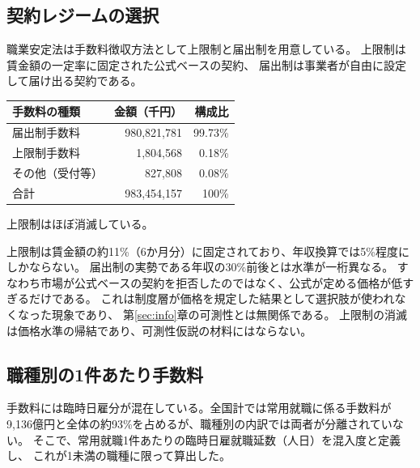 \subsection{契約レジームの選択}

職業安定法は手数料徴収方法として上限制と届出制を用意している。
上限制は賃金額の一定率に固定された公式ベースの契約、
届出制は事業者が自由に設定して届け出る契約である。

\begin{center}
\begin{tabular}{@{}lrr@{}}
\toprule
手数料の種類 & 金額（千円） & 構成比 \\
\midrule
届出制手数料 & 980,821,781 & 99.73\% \\
上限制手数料 & 1,804,568 & 0.18\% \\
その他（受付等） & 827,808 & 0.08\% \\
\midrule
合計 & 983,454,157 & 100\% \\
\bottomrule
\end{tabular}
\label{tab:family5-fee-type-breakdown}
\end{center}

上限制はほぼ消滅している。

\begin{remark}[この事実は可測性の証拠ではない]
上限制は賃金額の約11\%（6か月分）に固定されており、年収換算では5\%程度にしかならない。
届出制の実勢である年収の30\%前後とは水準が一桁異なる。
すなわち市場が公式ベースの契約を拒否したのではなく、公式が定める価格が低すぎるだけである。
これは制度層が価格を規定した結果として選択肢が使われなくなった現象であり、
第\ref{sec:info}章の可測性とは無関係である。
上限制の消滅は価格水準の帰結であり、可測性仮説の材料にはならない。
\end{remark}

\subsection{職種別の1件あたり手数料}

手数料には臨時日雇分が混在している。全国計では常用就職に係る手数料が
9,136億円と全体の約93\%を占めるが、職種別の内訳では両者が分離されていない。
そこで、常用就職1件あたりの臨時日雇就職延数（人日）を混入度と定義し、
これが1未満の職種に限って算出した。

